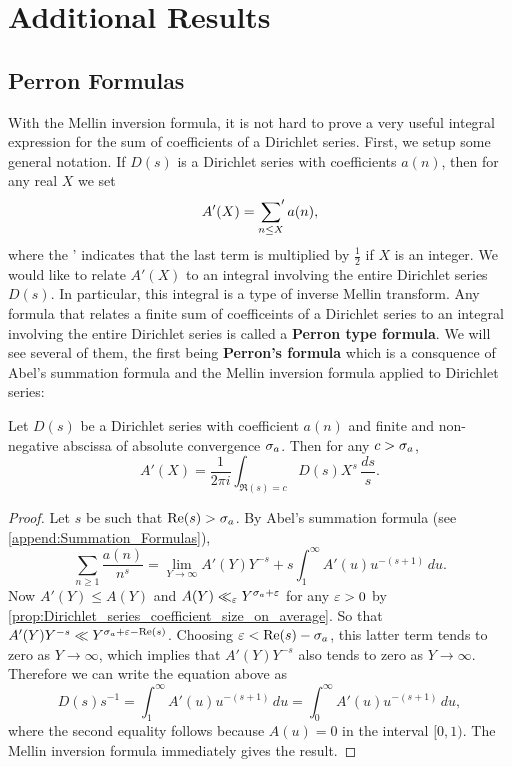   \chapter{Additional Results}
    \section{Perron Formulas}
      With the Mellin inversion formula, it is not hard to prove a very useful integral expression for the sum of coefficients of a Dirichlet series. First, we setup some general notation. If $D(s)$ is a Dirichlet series with coefficients $a(n)$, then for any real $X$ we set
      \[
        A'(X) = \sideset{}{'}\sum_{n \le X}a(n),
      \]
      where the ' indicates that the last term is multiplied by $\frac{1}{2}$ if $X$ is an integer. We would like to relate $A'(X)$ to an integral involving the entire Dirichlet series $D(s)$. In particular, this integral is a type of inverse Mellin transform. Any formula that relates a finite sum of coefficeints of a Dirichlet series to an integral involving the entire Dirichlet series is called a \textbf{Perron type formula}. We will see several of them, the first being \textbf{Perron's formula} which is a consquence of Abel's summation formula and the Mellin inversion formula applied to Dirichlet series:

      \begin{theorem}
        Let $D(s)$ be a Dirichlet series with coefficient $a(n)$ and finite and non-negative abscissa of absolute convergence $\sigma_{a}$. Then for any $c > \sigma_{a}$,
        \[
          A'(X) = \frac{1}{2\pi i}\int_{\Re(s) = c}D(s)X^{s}\,\frac{ds}{s}.
        \]
      \end{theorem}
      \begin{proof}
        Let $s$ be such that $\mathrm{Re}(s) > \sigma_{a}$. By Abel's summation formula (see \cref{append:Summation_Formulas}),
        \[
          \sum_{n \ge 1}\frac{a(n)}{n^{s}} = \lim_{Y \to \infty}A'(Y)Y^{-s}+s\int_{1}^{\infty}A'(u)u^{-(s+1)}\,du.
        \]
        Now $A'(Y) \le A(Y)$ and $A(Y) \ll_{\varepsilon} Y^{\sigma_{a}+\varepsilon}$ for any $\varepsilon > 0$ by \cref{prop:Dirichlet_series_coefficient_size_on_average}. So that $A'(Y)Y^{-s} \ll Y^{\sigma_{a}+\varepsilon-\mathrm{Re}(s)}$. Choosing $\varepsilon < \mathrm{Re}(s)-\sigma_{a}$, this latter term tends to zero as $Y \to \infty$, which implies that $A'(Y)Y^{-s}$ also tends to zero as $Y \to \infty$. Therefore we can write the equation above as
        \[
          D(s)s^{-1} = \int_{1}^{\infty}A'(u)u^{-(s+1)}\,du = \int_{0}^{\infty}A'(u)u^{-(s+1)}\,du,
        \]
        where the second equality follows because $A(u) = 0$ in the interval $[0,1)$. The Mellin inversion formula immediately gives the result.
      \end{proof}

